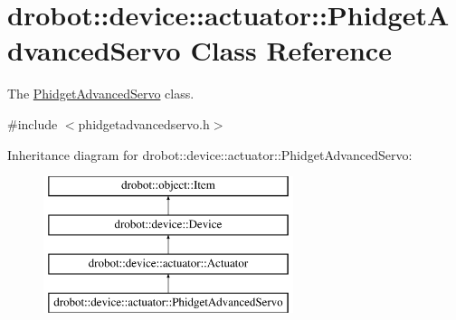 \hypertarget{classdrobot_1_1device_1_1actuator_1_1PhidgetAdvancedServo}{\section{drobot\-:\-:device\-:\-:actuator\-:\-:Phidget\-Advanced\-Servo Class Reference}
\label{classdrobot_1_1device_1_1actuator_1_1PhidgetAdvancedServo}
}


The \hyperlink{classdrobot_1_1device_1_1actuator_1_1PhidgetAdvancedServo}{Phidget\-Advanced\-Servo} class.  




{\ttfamily \#include $<$phidgetadvancedservo.\-h$>$}

Inheritance diagram for drobot\-:\-:device\-:\-:actuator\-:\-:Phidget\-Advanced\-Servo\-:\begin{figure}[H]
\begin{center}
\leavevmode
\includegraphics[height=4.000000cm]{classdrobot_1_1device_1_1actuator_1_1PhidgetAdvancedServo}
\end{center}
\end{figure}
